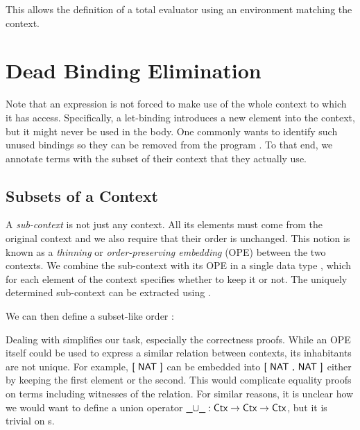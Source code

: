 \documentclass[11pt,a4paper]{article}
\newcommand{\Floor}[1]{\lfloor #1 \rfloor\xspace}
\begin{document}
\CodeLangExpr

This allows the definition of a total evaluator
using an environment matching the context.

\CodeLangSemantics


\section{Dead Binding Elimination}

Note that an expression is not forced to make use of the whole context to which it has access.
Specifically, a let-binding introduces a new element into the context, but it might never be used
in the body.
One commonly wants to identify such unused bindings so they can be removed from the program
\cite[Live Variable Analysis]{nielsen1999analysis}.
To that end, we annotate terms with the subset of their context that they actually use.


\subsection{Subsets of a Context}

A \emph{sub-context} is not just any context.
All its elements must come from the original context and we also require that their order is unchanged.
This notion is known as a \emph{thinning} or \emph{order-preserving embedding} (OPE) \cite{chapman2009type}
between the two contexts.
We combine the sub-context with its OPE in a single data type ,
which for each element of the context specifies whether to keep it or not.
The uniquely determined sub-context can be extracted using \AgdaFunction{$\Floor{\_}$}.

\CodeSubsetSubset

We can then define a subset-like order \AgdaFunction{$\subseteq$}:

\CodeSubsetOpSubseteq

Dealing with  simplifies our task, especially the correctness proofs.
While an OPE itself could be used to express a similar relation between contexts,
its inhabitants are not unique.
For example, $\AgdaInductiveConstructor{[\ NAT\ ]}$
can be embedded into $\AgdaInductiveConstructor{[\ NAT\ ,\ NAT\ ]}$
either by keeping the first element or the second.
This would complicate equality proofs on terms including witnesses of the relation.
For similar reasons, it is unclear how we would want to define a union operator
$\AgdaFunction{$\_\cup\_$} : \AgdaDatatype{Ctx} \to \AgdaDatatype{Ctx} \to \AgdaDatatype{Ctx}$,
but it is trivial on s.
\end{document}
